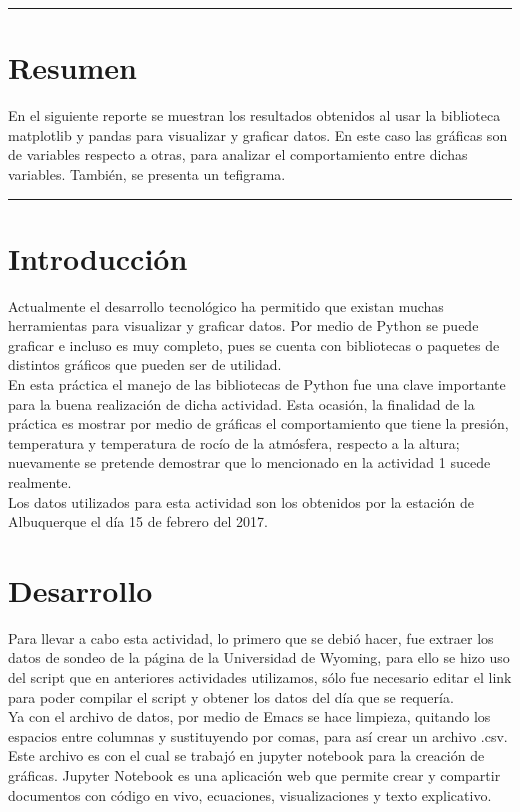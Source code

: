 \documentclass[12pt]{article}
\begin{document}
\begin{doublespace}
\hrule
\section*{Resumen}
En el siguiente reporte se muestran los resultados obtenidos al usar la biblioteca matplotlib y pandas para visualizar y graficar datos. En este caso las gráficas son de variables respecto a otras, para analizar el comportamiento entre dichas variables. También, se presenta un tefigrama.  
\vspace{0.6 cm}
\hrule

\vspace{0.6 cm}

\section{Introducción}
Actualmente el desarrollo tecnológico ha permitido que existan muchas herramientas para visualizar y graficar datos. Por medio de Python se puede graficar e incluso es muy completo, pues se cuenta con bibliotecas o paquetes de distintos gráficos que pueden ser de utilidad.
\\

En esta práctica el manejo de las bibliotecas de Python fue una clave importante para la buena realización de dicha actividad. Esta ocasión, la finalidad de la práctica es mostrar por medio de gráficas el comportamiento que tiene la presión, temperatura y temperatura de rocío de la atmósfera, respecto a la altura; nuevamente se pretende demostrar que lo mencionado en la actividad 1 sucede realmente. 
\\

Los datos utilizados para esta actividad son los obtenidos por la estación de Albuquerque el día 15 de febrero del 2017.

\section{Desarrollo}
Para llevar a cabo esta actividad, lo primero que se debió hacer, fue extraer los datos de sondeo de la página de la Universidad de Wyoming, para ello se hizo uso del script que en anteriores actividades utilizamos, sólo fue necesario editar el link para poder compilar el script y obtener los datos del día que se requería.
\\

Ya con el archivo de datos, por medio de Emacs se hace limpieza, quitando los espacios entre columnas y sustituyendo por comas, para así crear un archivo .csv. Este archivo es con el cual se trabajó en jupyter notebook para la creación de gráficas. Jupyter Notebook es una aplicación web que permite crear y compartir documentos con código en vivo, ecuaciones, visualizaciones y texto explicativo.
\\


\end{doublespace}
\end{document}
